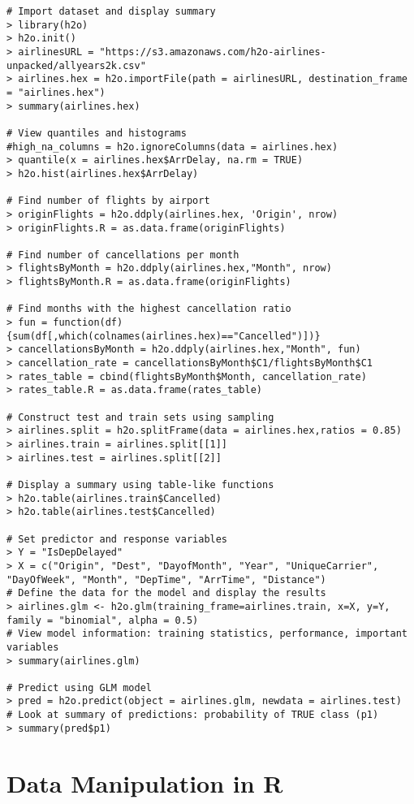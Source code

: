 \begin{lstlisting}[style=R]
# Import dataset and display summary
> library(h2o)
> h2o.init()
> airlinesURL = "https://s3.amazonaws.com/h2o-airlines-unpacked/allyears2k.csv"
> airlines.hex = h2o.importFile(path = airlinesURL, destination_frame = "airlines.hex")
> summary(airlines.hex)

# View quantiles and histograms
#high_na_columns = h2o.ignoreColumns(data = airlines.hex)
> quantile(x = airlines.hex$ArrDelay, na.rm = TRUE)
> h2o.hist(airlines.hex$ArrDelay)

# Find number of flights by airport
> originFlights = h2o.ddply(airlines.hex, 'Origin', nrow)
> originFlights.R = as.data.frame(originFlights)

# Find number of cancellations per month
> flightsByMonth = h2o.ddply(airlines.hex,"Month", nrow)
> flightsByMonth.R = as.data.frame(originFlights)

# Find months with the highest cancellation ratio
> fun = function(df) {sum(df[,which(colnames(airlines.hex)=="Cancelled")])}
> cancellationsByMonth = h2o.ddply(airlines.hex,"Month", fun)
> cancellation_rate = cancellationsByMonth$C1/flightsByMonth$C1
> rates_table = cbind(flightsByMonth$Month, cancellation_rate)
> rates_table.R = as.data.frame(rates_table)

# Construct test and train sets using sampling
> airlines.split = h2o.splitFrame(data = airlines.hex,ratios = 0.85)
> airlines.train = airlines.split[[1]]
> airlines.test = airlines.split[[2]]

# Display a summary using table-like functions
> h2o.table(airlines.train$Cancelled)
> h2o.table(airlines.test$Cancelled)

# Set predictor and response variables
> Y = "IsDepDelayed"
> X = c("Origin", "Dest", "DayofMonth", "Year", "UniqueCarrier", "DayOfWeek", "Month", "DepTime", "ArrTime", "Distance")
# Define the data for the model and display the results
> airlines.glm <- h2o.glm(training_frame=airlines.train, x=X, y=Y, family = "binomial", alpha = 0.5)
# View model information: training statistics, performance, important variables
> summary(airlines.glm)

# Predict using GLM model
> pred = h2o.predict(object = airlines.glm, newdata = airlines.test)
# Look at summary of predictions: probability of TRUE class (p1)
> summary(pred$p1)

\end{lstlisting}




\section{Data Manipulation in R}

